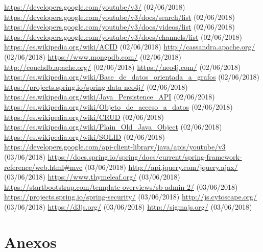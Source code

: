 \documentclass[11pt,a4paper]{article}
\begin{document}
\begin{thebibliography}{0}
   \url{https://developers.google.com/youtube/v3/} (02/06/2018) 
   \url{https://developers.google.com/youtube/v3/docs/search/list} (02/06/2018)  
   \url{https://developers.google.com/youtube/v3/docs/videos/list} (02/06/2018)  
   \url{https://developers.google.com/youtube/v3/docs/channels/list} (02/06/2018)
   \url{https://es.wikipedia.org/wiki/ACID} (02/06/2018)  
   \url{http://cassandra.apache.org/} (02/06/2018)
   \url{https://www.mongodb.com/} (02/06/2018)
   \url{http://couchdb.apache.org/} (02/06/2018)
   \url{https://neo4j.com/} (02/06/2018)
   \url{https://es.wikipedia.org/wiki/Base_de_datos_orientada_a_grafos} (02/06/2018)
   \url{https://projects.spring.io/spring-data-neo4j/} (02/06/2018) 
   \url{https://es.wikipedia.org/wiki/Java_Persistence_API} (02/06/2018) 
   \url{https://es.wikipedia.org/wiki/Objeto_de_acceso_a_datos} (02/06/2018) 
   \url{https://es.wikipedia.org/wiki/CRUD} (02/06/2018)
   \url{https://es.wikipedia.org/wiki/Plain_Old_Java_Object} (02/06/2018) 
   \url{https://es.wikipedia.org/wiki/SOLID} (02/06/2018) 
   \url{https://developers.google.com/api-client-library/java/apis/youtube/v3} (03/06/2018)
   \url{https://docs.spring.io/spring/docs/current/spring-framework-reference/web.html#mvc} (03/06/2018)
   \url{http://api.jquery.com/jquery.ajax/} (03/06/2018)
   \url{https://www.thymeleaf.org/} (03/06/2018)
   \url{https://startbootstrap.com/template-overviews/sb-admin-2/} (03/06/2018)
   \url{https://projects.spring.io/spring-security/} (03/06/2018)
   \url{http://js.cytoscape.org/} (03/06/2018)
   \url{https://d3js.org/} (03/06/2018)
   \url{http://sigmajs.org/} (03/06/2018)
\end{thebibliography}
\newpage 


\section{Anexos}
\bigskip
\end{document}
